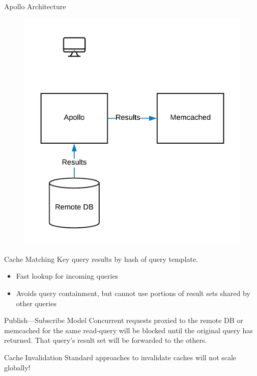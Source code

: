 \documentclass[10pt]{beamer}
\begin{document}
\begin{frame}[fragile]{Apollo Architecture}
    \begin{figure}
        \includegraphics[scale=0.17]{apollo_arch_diagram_8}
    \end{figure}
\end{frame}

\begin{frame}[fragile]{Cache Matching}
Key query results by \alert{hash of query template}.
\begin{itemize}
    \item{Fast lookup for incoming queries}
    \item{Avoids \alert{query containment}, but cannot use portions of result sets shared by other queries}
\end{itemize}
\end{frame}

\begin{frame}[fragile]{Publish---Subscribe Model}
Concurrent requests proxied to the remote DB or memcached for the same read-query will be blocked until the original query has returned.
That query's result set will be \alert{forwarded} to the others.
\end{frame}

\begin{frame}[fragile]{Cache Invalidation}
Standard approaches to invalidate caches will not scale globally!\\
\medskip
{}
\end{frame}
\end{document}
